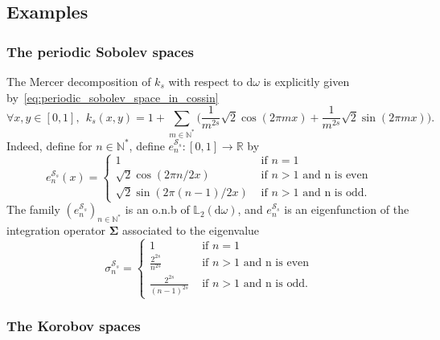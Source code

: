 \documentclass[twoside,11pt]{book}
\numberwithin{theorem}{chapter}
\numberwithin{definition}{chapter}
\numberwithin{proposition}{chapter}
\numberwithin{corollary}{chapter}
\numberwithin{example}{chapter}
\numberwithin{lemma}{chapter}
\numberwithin{assumption}{chapter}
\numberwithin{equation}{chapter}
\numberwithin{figure}{chapter}
\begin{document}
\subsection{Examples}
\label{subsec:kernel_examples}
\subsubsection{The periodic Sobolev spaces}
The Mercer decomposition of $k_{s}$ with respect to $\mathrm{d}\omega$ is explicitly given by~\eqref{eq:periodic_sobolev_space_in_cossin}
\begin{equation}
\forall x,y \in [0,1], \:\: k_{s}(x,y) = 1+ \sum\limits_{m \in \mathbb{N}^{*}} \Big( \frac{1}{m^{2s}} \sqrt{2}\cos (2\pi mx) + \frac{1}{m^{2s}} \sqrt{2}\sin (2\pi mx) \Big).
\end{equation}
Indeed, define for $n \in \mathbb{N}^{*}$, define $e_{n}^{\mathcal{S}_{s}}:[0,1] \rightarrow \mathbb{R}$ by
$$
e_{n}^{\mathcal{S}_{s}}(x) = \left\{
    \begin{array}{ll}
     1 & \text{ if } n=1\\
     \sqrt{2} \cos(2\pi n/2 x) & \text{ if } n>1 \text{ and n is even}\\
     \sqrt{2} \sin(2\pi (n-1)/2 x) & \text{ if } n>1 \text{ and n is odd}.
\end{array}
\right.
$$
The family $(e_n^{\mathcal{S}_{s}})_{n \in \mathbb{N}^{*}}$ is an o.n.b of $\mathbb{L}_{2}(\mathrm{d}\omega)$, and $e_n^{\mathcal{S}_{s}}$ is an eigenfunction of the integration operator $\bm{\Sigma}$ associated to the eigenvalue
$$
\sigma_{n}^{\mathcal{S}_{s}} = \left\{
    \begin{array}{ll}
     1 & \text{ if } n=1\\
     \frac{2^{2s}}{n^{2s}} & \text{ if } n>1 \text{ and n is even}\\
     \frac{2^{2s}}{(n-1)^{2s}} & \text{ if } n>1 \text{ and n is odd}.
\end{array}
\right.
$$

\subsubsection{The Korobov spaces}\label{sec:Korobov_spaces_def}
\end{document}

